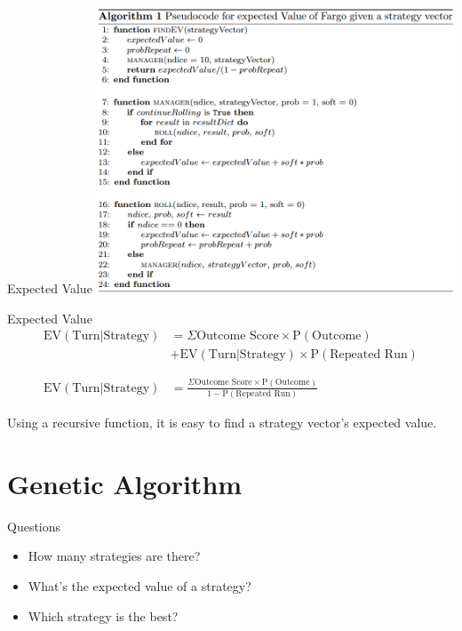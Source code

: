 \documentclass{beamer}
\begin{document}
  \begin{frame}{Expected Value}
    \centering
    \includegraphics[width = 0.8\textwidth]{pseudocode.png}
  \end{frame}

  \begin{frame}{Expected Value}
  	\begin{align*}
\text{EV}(\text{Turn}|\text{Strategy}) &= 
\Sigma \text{Outcome Score} \times \text{P}(\text{Outcome}) \\
&+  \text{EV}(\text{Turn}|\text{Strategy})\times \text{P}(\text{Repeated Run}) \\
\\
\\
\text{EV}(\text{Turn}|\text{Strategy}) &= 
\frac{\Sigma \text{Outcome Score} \times \text{P}(\text{Outcome})}{1-\text{P}(\text{Repeated Run})}
    \end{align*}

\vspace{15 pt}

  Using a recursive function, it is easy to find a strategy vector's expected value.
  \end{frame}










\section{Genetic Algorithm}
  \begin{frame}{Questions}
  \begin{itemize}
  	\item How many strategies are there?
    \item What's the expected value of a strategy?
    \item Which strategy is the best?
  \end{itemize}
  \end{frame}
  
\end{document}
